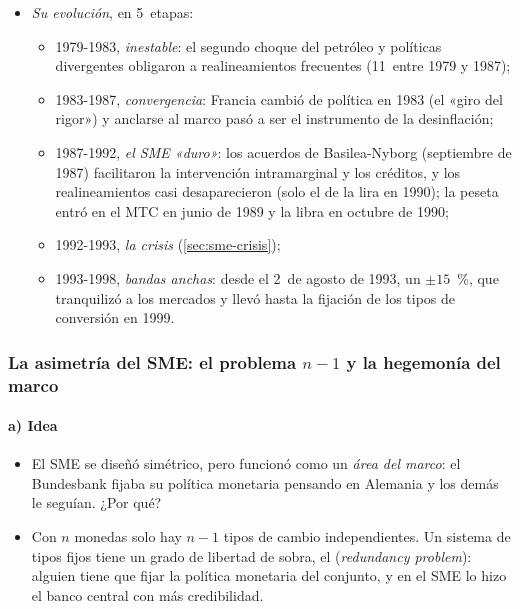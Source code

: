\documentclass[11pt]{article}
\begin{document}
\begin{itemize}
\begin{itemize}
  \item \emph{La financiación}: el FECOM daba créditos a muy corto plazo para intervenir y apoyo a corto y medio plazo para la balanza de pagos. En 1994 lo sustituyó el Instituto Monetario Europeo.
  \end{itemize}
\item \emph{Su evolución}, en 5~etapas:
  \begin{itemize}
  \item 1979-1983, \emph{inestable}: el segundo choque del petróleo y políticas divergentes obligaron a realineamientos frecuentes (11~entre 1979 y 1987)\nocite{TaylorArtis1988EMS};
  \item 1983-1987, \emph{convergencia}: Francia cambió de política en 1983 (el «giro del rigor») y anclarse al marco pasó a ser el instrumento de la desinflación;
  \item 1987-1992, \emph{el SME «duro»}: los acuerdos de Basilea-Nyborg (septiembre de 1987) facilitaron la intervención intramarginal y los créditos, y los realineamientos casi desaparecieron (solo el de la lira en 1990); la peseta entró en el MTC en junio de 1989 y la libra en octubre de 1990;
  \item 1992-1993, \emph{la crisis} (\ref{sec:sme-crisis});
  \item 1993-1998, \emph{bandas anchas}: desde el 2~de agosto de 1993, un $\pm15$~\%, que tranquilizó a los mercados y llevó hasta la fijación de los tipos de conversión en 1999.
  \end{itemize}
\end{itemize}

\subsubsection{La asimetría del SME:\cortetitulo{} el problema \texorpdfstring{$n-1$}{n-1} y la hegemonía del marco}\label{sec:asimetria}

\paragraph{a) Idea}

\begin{itemize}
\item El SME se diseñó simétrico, pero funcionó como un \emph{área del marco}: el Bundesbank fijaba su política monetaria pensando en Alemania y los demás le seguían. ¿Por qué?
\item Con $n$ monedas solo hay $n-1$ tipos de cambio independientes. Un sistema de tipos fijos tiene un grado de libertad de sobra, el  (\emph{redundancy problem}): alguien tiene que fijar la política monetaria del conjunto, y en el SME lo hizo el banco central con más credibilidad.
\end{itemize}
\end{document}
